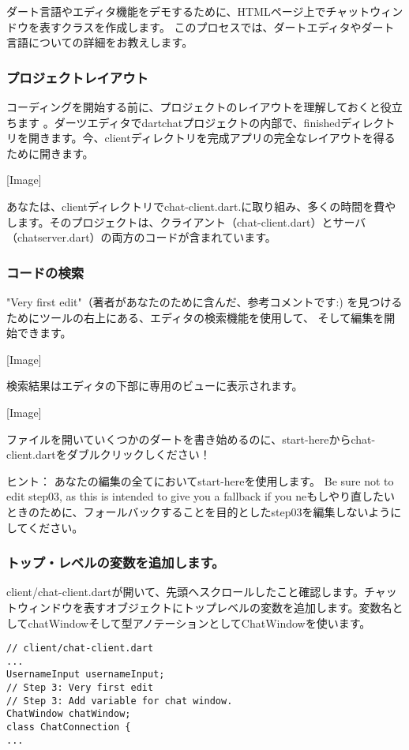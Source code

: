 ダート言語やエディタ機能をデモするために、HTMLページ上でチャットウィンドウを表すクラスを作成します。 このプロセスでは、ダートエディタやダート言語についての詳細をお教えします。

\subsubsection{プロジェクトレイアウト}

コーディングを開始する前に、プロジェクトのレイアウトを理解しておくと役立ちます
。ダーツエディタでdartchatプロジェクトの内部で、finishedディレクトリを開きます。今、clientディレクトリを完成アプリの完全なレイアウトを得るために開きます。

[Image]

あなたは、clientディレクトリでchat-client.dart.に取り組み、多くの時間を費やします。そのプロジェクトは、クライアント（chat-client.dart）とサーバ（chatserver.dart）の両方のコードが含まれています。

\subsubsection{コードの検索}

"Very first edit"（著者があなたのために含んだ、参考コメントです:)
を見つけるためにツールの右上にある、エディタの検索機能を使用して、
そして編集を開始できます。

[Image]

検索結果はエディタの下部に専用のビューに表示されます。

[Image]

ファイルを開いていくつかのダートを書き始めるのに、start-hereからchat-client.dartをダブルクリックしください！

ヒント： あなたの編集の全てにおいてstart-hereを使用します。 Be sure not to edit step03, as this is intended to give you a fallback if you neもしやり直したいときのために、フォールバックすることを目的としたstep03を編集しないようにしてください。

\subsubsection{トップ・レベルの変数を追加します。}

client/chat-client.dartが開いて、先頭へスクロールしたこと確認します。チャットウィンドウを表すオブジェクトにトップレベルの変数を追加します。変数名としてchatWindowそして型アノテーションとしてChatWindowを使います。


\begin{verbatim}
// client/chat-client.dart
...
UsernameInput usernameInput;
// Step 3: Very first edit
// Step 3: Add variable for chat window.
ChatWindow chatWindow;
class ChatConnection {
...
\end{verbatim}

